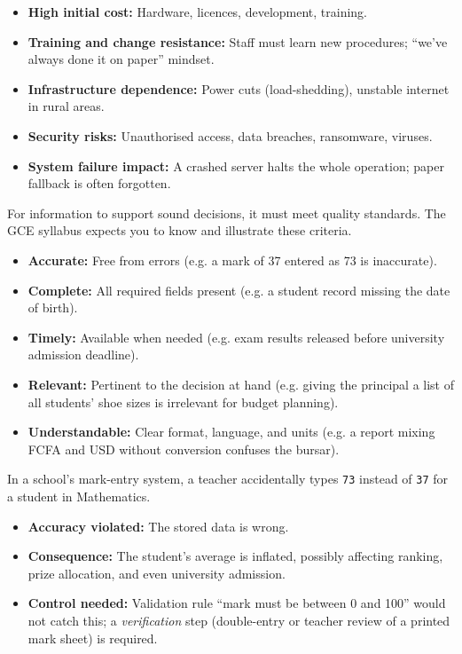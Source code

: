\documentclass[11pt]{article}
\newcounter{popsec}
\newcounter{popsub}
\newcommand{\courssub}[1]{%
  \stepcounter{popsub}%
  \par\vspace{9pt}\noindent{\popxbold\fontsize{11.5}{13}\selectfont\color{popink}{\color{poporange}\thepopsec.\thepopsub}\hspace{6pt}#1}\par\nopagebreak\vspace{4pt}
}
\begin{document}
\begin{propriete}
\begin{itemize}
    \item \textbf{High initial cost:} Hardware, licences, development, training.
    \item \textbf{Training and change resistance:} Staff must learn new procedures; ``we've always done it on paper'' mindset.
    \item \textbf{Infrastructure dependence:} Power cuts (load-shedding), unstable internet in rural areas.
    \item \textbf{Security risks:} Unauthorised access, data breaches, ransomware, viruses.
    \item \textbf{System failure impact:} A crashed server halts the whole operation; paper fallback is often forgotten.
\end{itemize}
\end{propriete}

\courssub{Information Quality Criteria}

For information to support sound decisions, it must meet quality standards. The GCE syllabus expects you to know and illustrate these criteria.

\begin{definition}
\begin{itemize}
    \item \textbf{Accurate:} Free from errors (e.g. a mark of 37 entered as 73 is inaccurate).
    \item \textbf{Complete:} All required fields present (e.g. a student record missing the date of birth).
    \item \textbf{Timely:} Available when needed (e.g. exam results released before university admission deadline).
    \item \textbf{Relevant:} Pertinent to the decision at hand (e.g. giving the principal a list of all students' shoe sizes is irrelevant for budget planning).
    \item \textbf{Understandable:} Clear format, language, and units (e.g. a report mixing FCFA and USD without conversion confuses the bursar).
\end{itemize}
\end{definition}

\begin{exemplebox}
In a school's mark-entry system, a teacher accidentally types \texttt{73} instead of \texttt{37} for a student in Mathematics.
\begin{itemize}
    \item \textbf{Accuracy violated:} The stored data is wrong.
    \item \textbf{Consequence:} The student's average is inflated, possibly affecting ranking, prize allocation, and even university admission.
    \item \textbf{Control needed:} Validation rule ``mark must be between 0 and 100'' would not catch this; a \emph{verification} step (double-entry or teacher review of a printed mark sheet) is required.
\end{itemize}
\end{exemplebox}
\end{document}
